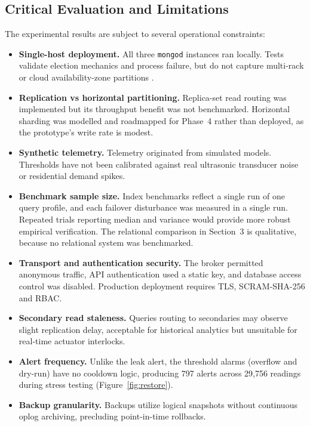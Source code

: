 \documentclass[11pt,a4paper]{article}
\begin{document}
\subsection{Critical Evaluation and Limitations}\label{sec:limits}
The experimental results are subject to several operational constraints:
\begin{itemize}[noitemsep]
\item \textbf{Single-host deployment.} All three \texttt{mongod} instances ran locally. Tests validate election mechanics and process failure, but do not capture multi-rack or cloud availability-zone partitions \citep{mongoRepl}.
\item \textbf{Replication vs horizontal partitioning.} Replica-set read routing was implemented but its throughput benefit was not benchmarked. Horizontal sharding was modelled and roadmapped for Phase~4 rather than deployed, as the prototype's write rate is modest.
\item \textbf{Synthetic telemetry.} Telemetry originated from simulated models. Thresholds have not been calibrated against real ultrasonic transducer noise or residential demand spikes.
\item \textbf{Benchmark sample size.} Index benchmarks reflect a single run of one query profile, and each failover disturbance was measured in a single run. Repeated trials reporting median and variance would provide more robust empirical verification. The relational comparison in Section~3 is qualitative, because no relational system was benchmarked.
\item \textbf{Transport and authentication security.} The broker permitted anonymous traffic, API authentication used a static key, and database access control was disabled. Production deployment requires TLS, SCRAM-SHA-256 and RBAC.
\item \textbf{Secondary read staleness.} Queries routing to secondaries may observe slight replication delay, acceptable for historical analytics but unsuitable for real-time actuator interlocks.
\item \textbf{Alert frequency.} Unlike the leak alert, the threshold alarms (overflow and dry-run) have no cooldown logic, producing 797 alerts across 29,756 readings during stress testing (Figure~\ref{fig:restore}).
\item \textbf{Backup granularity.} Backups utilize logical snapshots without continuous oplog archiving, precluding point-in-time rollbacks.
\end{itemize}
\end{document}
